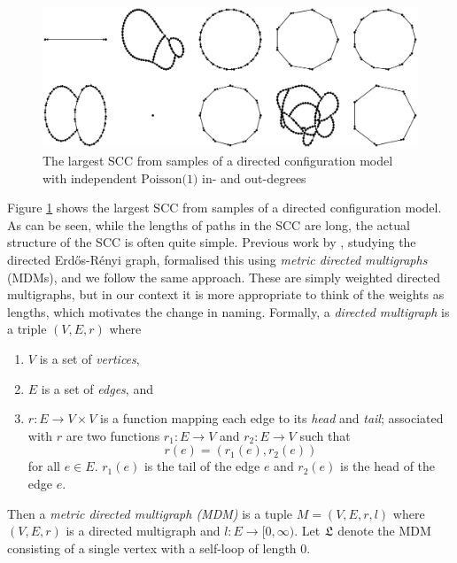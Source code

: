 \begin{figure}[htbp]
    \centering

    \includegraphics[width=\textwidth]{Content/Pictures/Fig3.eps}
    
    \caption{The largest SCC from samples of a directed configuration model with independent $\text{Poisson(1)}$ in- and out-degrees}
    \label{fig:largest-sccs}
\end{figure}

Figure \ref{fig:largest-sccs} shows the largest SCC from samples of a directed configuration model. As can be seen, while the lengths of paths in the SCC are long, the actual structure of the SCC is often quite simple. Previous work by \citet{goldschmidtScalingLimitCritical2021}, studying the directed Erd\H{o}s-R\'{e}nyi graph, formalised this using \emph{metric directed multigraphs} (MDMs), and we follow the same approach. These are simply weighted directed multigraphs, but in our context it is more appropriate to think of the weights as lengths, which motivates the change in naming. Formally, a \emph{directed multigraph} is a triple $(V, E, r)$ where
\begin{enumerate}
    \item $V$ is a set of \emph{vertices},
    \item $E$ is a set of \emph{edges}, and
    \item $r: E \to V \times V$ is a function mapping each edge to its \emph{head} and \emph{tail}; associated with $r$ are two functions $r_1: E \to V$ and $r_2: E \to V$ such that
\begin{equation*}
    r(e) = (r_1(e), r_2(e))
\end{equation*}
for all $e \in E$. $r_1(e)$ is the tail of the edge $e$ and $r_2(e)$ is the head of the edge $e$.
\end{enumerate}
 Then a \emph{metric directed multigraph (MDM)} is a tuple $M = (V, E, r, l)$ where $(V, E, r)$ is a directed multigraph and $l:E \to [0, \infty)$. Let $\mathfrak L$ denote the MDM consisting of a single vertex with a self-loop of length 0.


